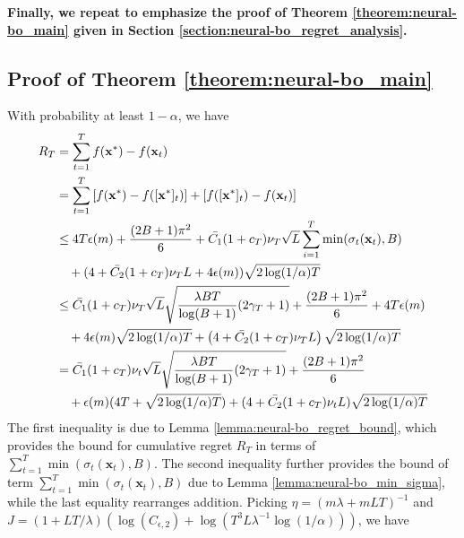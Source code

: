\noindent \textbf{Finally, we repeat to emphasize the proof of Theorem \ref{theorem:neural-bo_main} given in Section \ref{section:neural-bo_regret_analysis}.}
\subsection{Proof of Theorem \ref{theorem:neural-bo_main}}

With probability at least $1-\alpha$, we have
\begin{align*}
 R_T &  = \sum^T_{t=1} f(\mathbf{x^*}) - f(\mathbf{x}_t) \\ 
     & = \sum^T_{t=1} \left[f(\mathbf{x}^*) - f([\mathbf{x}^*]_t)\right] + \left[f([\mathbf{x}^*]_t) - f(\mathbf{x}_t) \right] \\ 
     &\leq 4T \epsilon(m) + \frac{(2B+1)\pi^2}{6} + \Bar{C_1}(1+c_T)\nu_T \sqrt{L} \sum^T_{i=1} \min(\sigma_t(\mathbf{x}_t), B) \\
     & \quad +(4+\Bar{C_2}(1+c_T)\nu_T L + 4\epsilon(m))\sqrt{2 \log(1/\alpha)T} \\
     & \leq \Bar{C_1}(1+c_T)\nu_T \sqrt{L} \sqrt{\frac{\lambda BT}{\log(B+1)} (2\gamma_T+1)} 
     + \frac{(2B+1)\pi^2}{6} + 4T \epsilon(m) \\
     & \quad + 4\epsilon(m)\sqrt{2 \log(1/\alpha)T}  +  \left(4+\Bar{C_2}(1+c_T)\nu_T L\right)\sqrt{2 \log(1/\alpha)T}  \\
     &  = \Bar{C_1}(1+c_T)\nu_t \sqrt{L} \sqrt{\frac{\lambda BT}{\log(B+1)} (2\gamma_T+1)} + \frac{(2B+1)\pi^2}{6} \\
     & \quad +  \epsilon(m)(4T+ \sqrt{2 \log(1/\alpha)T}) + (4+\Bar{C_2}(1+c_T)\nu_t L)\sqrt{2 \log(1/\alpha)T} \\
     \end{align*} 
The first inequality is due to Lemma \ref{lemma:neural-bo_regret_bound}, which provides the bound for cumulative regret $R_T$ in terms of $\sum^T_{t=1} \min(\sigma_t(\mathbf{x}_t),B)$.  The second inequality further provides the bound of term $\sum^T_{t=1} \min(\sigma_t(\mathbf{x}_t),B)$ due to Lemma \ref{lemma:neural-bo_min_sigma}, while the last equality rearranges addition.   Picking $\eta = (m\lambda + mLT)^{-1}$ and $J = \left(1+LT/\lambda \right) \left(\log (C_{\epsilon,2} ) + \log(T^3L\lambda^{-1}\log(1/\alpha)) \right)$, we have 
